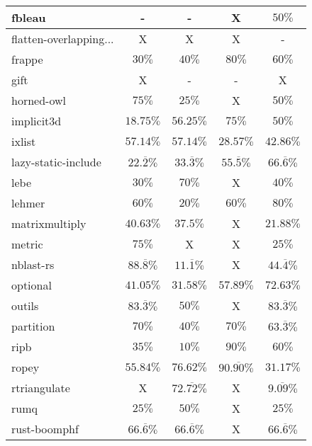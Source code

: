 \documentclass{article}
\begin{document}
\begin{longtable}[h!]{|l|c|c|c|c|}
    \hline
    fbleau & - & - & X & $50\%$ \\ %
    \hline
    flatten-overlapping... & X & X & X & - \\ %
    \hline
    frappe & $30\%$ & $40\%$ & $80\%$ & $60\%$ \\ %
     \hline
    gift & X & - & - & X \\ %
    \hline
    horned-owl & $75\%$ & $25\%$ & X & $50\%$ \\ %
    \hline
    implicit3d & $18.75\%$ & $56.25\%$ & $75\%$ & $50\%$ \\ %
    \hline
    ixlist & $57.14\%$ & $57.14\%$ & $28.57\%$ & $42.86\%$ \\ %
    \hline
    lazy-static-include & $22.\overline{2}\%$ & $33.\overline{3}\%$ & $55.\overline{5}\%$ & $66.\overline{6}\%$ \\ %
    \hline
    lebe & $30\%$ & $70\%$ & X & $40\%$ \\ %
     \hline
    lehmer & $60\%$ & $20\%$ & $60\%$ & $80\%$ \\ %
    \hline
    matrixmultiply & $40.63\%$ & $37.5\%$ & X & $21.88\%$ \\ %
    \hline
    metric & $75\%$ & X & X & $25\%$ \\ %
    \hline
    nblast-rs & $88.\overline{8}\%$ & $11.\overline{1}\%$ & X & $44.\overline{4}\%$ \\ %
    \hline
    optional & $41.05\%$ & $31.58\%$ & $57.89\%$ & $72.63\%$ \\ %
    \hline
    outils & $83.\overline{3}\%$ & $50\%$ & X & $83.\overline{3}\%$ \\ %
     \hline
    partition & $70\%$ & $40\%$ & $70\%$ & $63.\overline{3}\%$ \\ %
    \hline
    ripb & $35\%$ & $10\%$ & $90\%$ & $60\%$ \\ %
    \hline
    ropey & $55.84\%$ & $76.62\%$ & $90.\overline{90}\%$ & $31.17\%$ \\ %
    \hline
    rtriangulate & X & $72.\overline{72}\%$ & X & $9.\overline{09}\%$ \\ %
    \hline
    rumq & $25\%$ & $50\%$ & X & $25\%$ \\ %
    \hline
    rust-boomphf & $66.\overline{6}\%$ & $66.\overline{6}\%$ & X & $66.\overline{6}\%$ \\ %
     \hline

\end{longtable}
\end{document}

